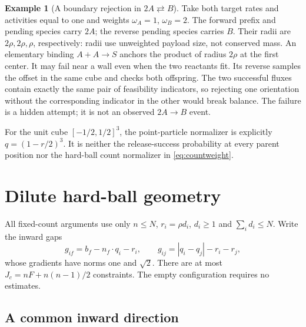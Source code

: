 \documentclass[11pt]{article}
\numberwithin{equation}{section}
\theoremstyle{definition}
\newtheorem{example}[theorem]{Example}
\theoremstyle{remark}\newtheorem{remark}[theorem]{Remark}
\begin{document}
\begin{example}[A boundary rejection in $2A\rightleftarrows B$]
\label{ex:binary}
Take both target rates and activities equal to one and weights
$\omega_A=1$, $\omega_B=2$. The forward prefix and pending species carry
$2A$; the reverse pending species carries $B$. Their radii are
$2\rho,2\rho,\rho$, respectively: radii use unweighted payload size,
not conserved mass. An elementary binding $A+A\to S$ anchors the product
of radius $2\rho$ at the first center. It may fail near a wall even when
the two reactants fit. Its reverse samples the offset in the same cube and
checks both offspring. The two successful fluxes contain exactly the same
pair of feasibility indicators, so rejecting one orientation without the
corresponding indicator in the other would break balance. The failure is a
hidden attempt; it is not an observed $2A\to B$ event.

For the unit cube $[-1/2,1/2]^3$, the point-particle normalizer is explicitly
$q=(1-r/2)^3$. It is neither the release-success probability at every parent
position nor the hard-ball count normalizer in \eqref{eq:countweight}.
\end{example}



\section{Dilute hard-ball geometry}
\label{sec:geometry}

All fixed-count arguments use only
$n\le N$, $r_i=\rho d_i$, $d_i\ge1$ and $\sum_i d_i\le N$.
Write the inward gaps
\begin{equation}\label{eq:gaps}
 g_{if}=b_f-n_f\cdot q_i-r_i,\qquad
 g_{ij}=|q_i-q_j|-r_i-r_j,
\end{equation}
whose gradients have norms one and $\sqrt2$. There are at most
$J_c=nF+n(n-1)/2$ constraints. The empty configuration requires no estimates.

\subsection{A common inward direction}
\end{document}
